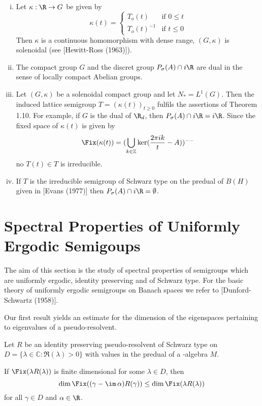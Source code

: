 \begin{remark}\label{rem:d3-1.13}
\begin{enumerate}[(i), wide]
\item Let $\kappa:\R \to G$ be given by
\[
\kappa(t) = \begin{cases}
T_{o}(t) & \text{if } 0 \leq t \\
T_{o}(t)^{-1} & \text{if } t \leq 0
\end{cases}
\]
Then $\kappa$ is a continuous homomorphism with dense range, \ie $(G,\kappa)$ is solenoidal (see [Hewitt-Ross (1963)]).

\item The compact group $G$ and the discret group $P_{\sigma}(A) \cap i\R$ are dual in the sense of locally compact Abelian groups.

\item Let $(G,\kappa)$ be a solenoidal compact group and let $N_{*} = L^{1}(G)$.
Then the induced lattice semigroup $T = (\kappa(t))_{t \geq 0}$ fulfils the assertions of Theorem 1.10.
For example, if $G$ is the dual of $\R_{d}$, then $P_{\sigma}(A) \cap i\R = i\R$.
Since the fixed space of $\kappa(t)$ is given by
\[
\Fix(\kappa(t)) = (\bigcup_{k \in \mathbb{Z}} \ker(\frac{2\pi ik}{t} - A))^{--}
\]
no $T(t) \in T$ is irreducible.

\item If $T$ is the irreducible semigroup of Schwarz type on the predual of $B(H)$ given in [Evans (1977)] then $P_{\sigma}(A) \cap i\R = \emptyset$.
\end{enumerate}
\end{remark}

\section{Spectral Properties of Uniformly Ergodic Semigoups}\label{sec:d3-2}

The aim of this section is the study of spectral properties of semigroups which are uniformly ergodic, identity preserving and of Schwarz type.
For the basic theory of uniformly ergodic semigroups on Banach spaces we refer to [Dunford-Schwartz (1958)].






Our first result yields an estimate for the dimension of the eigenspaces pertaining to eigenvalues of a pseudo-resolvent.

\begin{proposition}\label{prop:d3-2.1}
Let $R$ be an identity preserving pseudo-resolvent of Schwarz type on $D = \{\lambda \in \mathbb{C} \colon \Re(\lambda) > 0\}$ with values in the predual of a \WA-algebra $M$.

If $\Fix(\lambda R(\lambda))$ is finite dimensional for some $\lambda \in D$, then
\[
\dim \Fix((\gamma - \im\,\alpha)R(\gamma)) \leq \dim \Fix(\lambda R(\lambda))
\]
for all $\gamma \in D$ and $\alpha \in \R$.
\end{proposition}

